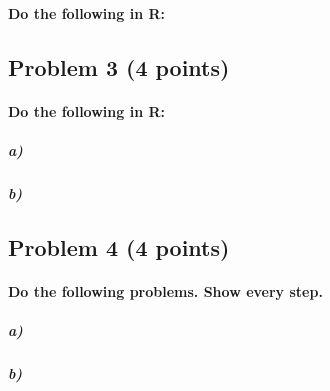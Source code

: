 \documentclass[12pt]{article}
\begin{document}
\paragraph{Do the following in R:}

\subparagraph{} 



\subsection*{Problem 3 (4 points)}

\paragraph{Do the following in R:}

\subparagraph{a)} 

\subparagraph{b)} 



\subsection*{Problem 4 (4 points)}

\paragraph{Do the following problems. Show every step.}

\subparagraph{a)}

\subparagraph{b)}
\end{document}
